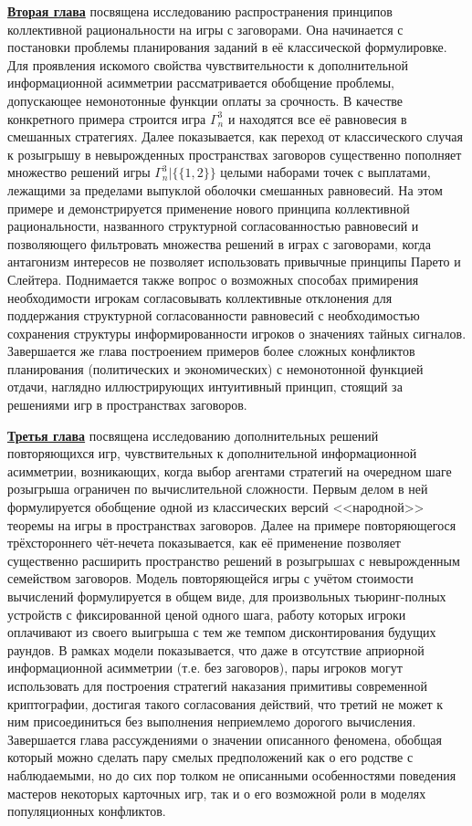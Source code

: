 \underline{\textbf{Вторая глава}} посвящена исследованию распространения принципов коллективной рациональности на игры с заговорами. Она начинается с постановки проблемы планирования заданий в её классической формулировке. Для проявления искомого свойства чувствительности к дополнительной информационной асимметрии рассматривается обобщение проблемы, допускающее немонотонные функции оплаты за срочность. В качестве конкретного примера строится игра $\Gamma^3_n$ и находятся все её равновесия в смешанных стратегиях. Далее показывается, как переход от классического случая к розыгрышу в невырожденных пространствах заговоров существенно пополняет множество решений игры $\Gamma^3_n | \{\{1,2\}\}$ целыми наборами точек с выплатами, лежащими за пределами выпуклой оболочки смешанных равновесий. На этом примере и демонстрируется применение нового принципа коллективной рациональности, названного структурной согласованностью равновесий и позволяющего фильтровать множества решений в играх с заговорами, когда антагонизм интересов не позволяет использовать привычные принципы Парето и Слейтера. Поднимается также вопрос о возможных способах примирения необходимости игрокам согласовывать коллективные отклонения для поддержания структурной согласованности равновесий с необходимостью сохранения структуры информированности игроков о значениях тайных сигналов. Завершается же глава построением примеров более сложных конфликтов планирования (политических и экономических) с немонотонной функцией отдачи, наглядно иллюстрирующих интуитивный принцип, стоящий за решениями игр в пространствах заговоров.

\underline{\textbf{Третья глава}} посвящена исследованию дополнительных решений повторяющихся игр, чувствительных к дополнительной информационной асимметрии, возникающих, когда выбор агентами стратегий на очередном шаге розыгрыша ограничен по вычислительной сложности. Первым делом в ней формулируется обобщение одной из классических версий <<народной>> теоремы на игры в пространствах заговоров. Далее на примере повторяющегося трёхстороннего чёт-нечета показывается, как её применение позволяет существенно расширить пространство решений в розыгрышах с невырожденным семейством заговоров. Модель повторяющейся игры с учётом стоимости вычислений формулируется в общем виде, для произвольных тьюринг-полных устройств с фиксированной ценой одного шага, работу которых игроки оплачивают из своего выигрыша с тем же темпом дисконтирования будущих раундов. В рамках модели показывается, что даже в отсутствие априорной информационной асимметрии (т.е. без заговоров), пары игроков могут использовать для построения стратегий наказания примитивы современной криптографии, достигая такого согласования действий, что третий не может к ним присоединиться без выполнения неприемлемо дорогого вычисления. Завершается глава рассуждениями о значении описанного феномена, обобщая который можно сделать пару смелых предположений как о его родстве с наблюдаемыми, но до сих пор толком не описанными особенностями поведения мастеров некоторых карточных игр, так и о его возможной роли в моделях популяционных конфликтов.

